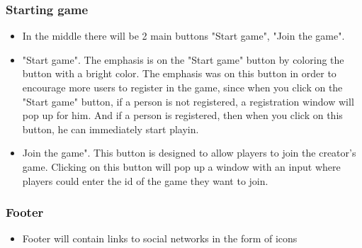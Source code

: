 		\subsubsection{Starting game}
		\begin{itemize}
			\item In the middle there will be 2 main buttons "Start game", "Join the game".
			\item "Start game". The emphasis is on the "Start game" button by coloring the button with a bright color. The emphasis was on this button in order to encourage more users to register in the game, since when you click on the "Start game" button, if a person is not registered, a registration window will pop up for him. And if a person is registered, then when you click on this button, he can immediately start playin.
			\item Join the game". This button is designed to allow players to join the creator's game. Clicking on this button will pop up a window with an input where players could enter the id of the game they want to join.
		\end{itemize}
		\subsubsection{Footer}
		\begin{itemize}
			\item Footer will contain links to social networks in the form of icons
		\end{itemize}